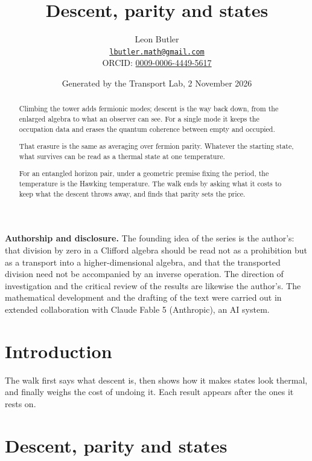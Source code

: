 \documentclass[11pt]{article}
\title{\bfseries Descent, parity and states}
\author{Leon Butler\\ \normalsize\href{mailto:lbutler.math@gmail.com}{\texttt{lbutler.math@gmail.com}}\\ \normalsize ORCID: \href{https://orcid.org/0009-0006-4449-5617}{0009-0006-4449-5617}}
\date{Generated by the Transport Lab, 2 November 2026}
\theoremstyle{definition}
\theoremstyle{plain}
\begin{document}
\maketitle
\begin{abstract}
\normalsize
Climbing the tower adds fermionic modes; descent is the way back down, from the enlarged algebra to what an observer can see. For a single mode it keeps the occupation data and erases the quantum coherence between empty and occupied.

That erasure is the same as averaging over fermion parity. Whatever the starting state, what survives can be read as a thermal state at one temperature.

For an entangled horizon pair, under a geometric premise fixing the period, the temperature is the Hawking temperature. The walk ends by asking what it costs to keep what the descent throws away, and finds that parity sets the price.
\end{abstract}
\newpage
\noindent \textbf{Authorship and disclosure. }The founding idea of the series is the author's: that division by zero in a Clifford algebra should be read not as a prohibition but as a transport into a higher-dimensional algebra, and that the transported division need not be accompanied by an inverse operation. The direction of investigation and the critical review of the results are likewise the author's. The mathematical development and the drafting of the text were carried out in extended collaboration with Claude Fable 5 (Anthropic), an AI system.

\noindent{}
\newpage

\section*{Introduction}
The walk first says what descent is, then shows how it makes states look thermal, and finally weighs the cost of undoing it. Each result appears after the ones it rests on.

\section{Descent, parity and states}
\end{document}
